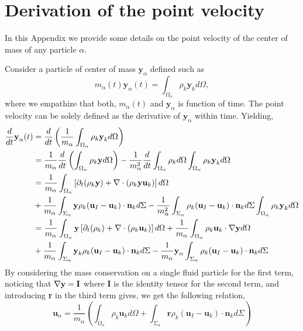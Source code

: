 \section{Derivation of the point velocity}
\label{ap:velocity_definition}
In this Appendix we provide some details on the point velocity of the center of mass of any particle $\alpha$. 

Consider a particle of center of mass $\textbf{y}_\alpha$ defined such as
\begin{equation*}
    m_\alpha(t) \textbf{y}_\alpha(t)
    = \int_{\Omega_\alpha} \rho_k \textbf{y}_k d\Omega,
\end{equation*}
where we empathize that both, $m_\alpha(t)$ and $\textbf{y}_\alpha$ is function of time. 
The point velocity can be solely defined as the derivative of $\textbf{y}_\alpha$ within time.
Yielding, 
\begin{align*}
    \frac{d}{d t} \textbf{y}_\alpha (t)
    &=
    \frac{d}{d t} \left(
        \frac{1}{m_\alpha} \int_{\Omega_\alpha} \rho_k \textbf{y}_k d\Omega
    \right)\\
    &= \frac{1}{m_\alpha}
    \frac{d}{d t} 
    \left(
        \int_{\Omega_\alpha} \rho_k \textbf{y} d\Omega
    \right)
    - \frac{1}{m_\alpha^2} \frac{d}{d t} \int_{\Omega_\alpha} \rho_k d\Omega \int_{\Omega_\alpha} \rho_k \textbf{y}_k d\Omega
    \\
    &= \frac{1}{m_\alpha}\int_{\Omega_\alpha} \left[
        \partial_t (\rho_k \textbf{y}) + \mathbf{\nabla} \cdot\left(\rho_k \textbf{y}\textbf{u}_k\right) 
    \right]d\Omega \\
    &+ \frac{1}{m_\alpha}\int_{\Sigma_\alpha} \textbf{y} \rho_k(\textbf{u}_I   - \textbf{u}_k) \cdot \textbf{n}_k d \Sigma
    -  \frac{1}{m_\alpha^2} \int_{\Sigma_\alpha} \rho_k(\textbf{u}_I   - \textbf{u}_k) \cdot \textbf{n}_k d\Sigma  \int_{\Omega_\alpha} \rho_k \textbf{y}_k d\Omega
    \\
    &= \frac{1}{m_\alpha}\int_{\Omega_\alpha} \textbf{y} \left[
    \partial_t (\rho_k) + \mathbf{\nabla} \cdot\left(\rho_k \textbf{u}_k\right) 
    \right]d\Omega
    + \frac{1}{m_\alpha}\int_{\Omega_\alpha} \rho_k  \textbf{u}_k  \cdot \mathbf{\nabla} \textbf{y} d\Omega \\
    &+ \frac{1}{m_\alpha}\int_{\Sigma_\alpha} \textbf{y}_k \rho_k (\textbf{u}_I - \textbf{u}_k) \cdot \textbf{n}_k d \Sigma
    - \frac{1}{m_\alpha}  \textbf{y}_\alpha \int_{\Sigma_\alpha} \rho_k(\textbf{u}_I   - \textbf{u}_k) \cdot \textbf{n}_k d\Sigma
\end{align*}
By considering the mass conservation on a single fluid particle for the first term, noticing that $\mathbf{\nabla} \textbf{y} = \textbf{I}$ where $\textbf{I}$ is the identity tensor for the second term, and introducing \textbf{r} in the third term gives, we get the following relation,
\begin{equation*}
    \textbf{u}_\alpha
    = \frac{1}{m_\alpha} \left(
        \int_{\Omega_\alpha} \rho_k \textbf{u}_k d\Omega
        +  \int_{\Sigma_\alpha} \textbf{r} \rho_k (\textbf{u}_I - \textbf{u}_k) \cdot \textbf{n}_k d\Sigma
    \right)
\end{equation*}


